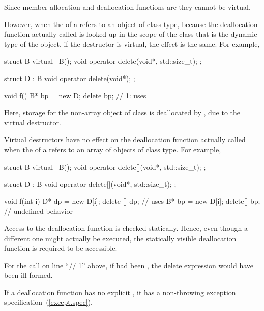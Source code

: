 \pnum
Since member allocation and deallocation functions are
they cannot be virtual.
\begin{note}
%
%
However, when the
of a
refers to an object of class type,
because the deallocation function actually called is looked up in the scope of
the class that is the dynamic type of the object,
if the destructor is virtual, the effect is the same.
For example,
\begin{codeblock}
struct B {
  virtual ~B();
  void operator delete(void*, std::size_t);
};

struct D : B {
  void operator delete(void*);
};

void f() {
  B* bp = new D;
  delete bp;        // 1: uses 
}
\end{codeblock}
Here, storage for the non-array object of class
is deallocated by
,
due to the virtual destructor.
\end{note}
\begin{note}
Virtual destructors have no effect on the deallocation function actually
called when the
of a
refers to an array of objects of class type.
For example,
\begin{codeblock}
struct B {
  virtual ~B();
  void operator delete[](void*, std::size_t);
};

struct D : B {
  void operator delete[](void*, std::size_t);
};

void f(int i) {
  D* dp = new D[i];
  delete [] dp;     // uses 
  B* bp = new D[i];
  delete[] bp;      // undefined behavior
}
\end{codeblock}
\end{note}

\pnum
Access to the deallocation function is checked statically.
Hence, even though a different one might actually be executed,
the statically visible deallocation function is required to be accessible.
\begin{example}
For the call on line ``// 1'' above,
if
had been
,
the delete expression would have been ill-formed.
\end{example}

\pnum
\begin{note}
If a deallocation function has no explicit , it
has a non-throwing exception specification~(\ref{except.spec}).
\end{note}

